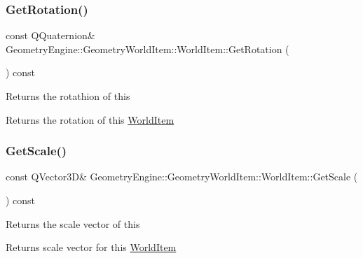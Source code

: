 \subsubsection{\texorpdfstring{GetRotation()}{GetRotation()}}
{\footnotesize\ttfamily const Q\+Quaternion\& Geometry\+Engine\+::\+Geometry\+World\+Item\+::\+World\+Item\+::\+Get\+Rotation (\begin{DoxyParamCaption}{ }\end{DoxyParamCaption}) const\hspace{0.3cm}{\ttfamily [inline]}}

Returns the rotathion of this \begin{DoxyReturn}{Returns}
the rotation of this \mbox{\hyperlink{class_geometry_engine_1_1_geometry_world_item_1_1_world_item}{World\+Item}} 
\end{DoxyReturn}
\mbox{\label{class_geometry_engine_1_1_geometry_world_item_1_1_world_item_a34e1c2617262114189597b1092a2d8ca}} 
\subsubsection{\texorpdfstring{GetScale()}{GetScale()}}
{\footnotesize\ttfamily const Q\+Vector3D\& Geometry\+Engine\+::\+Geometry\+World\+Item\+::\+World\+Item\+::\+Get\+Scale (\begin{DoxyParamCaption}{ }\end{DoxyParamCaption}) const\hspace{0.3cm}{\ttfamily [inline]}}

Returns the scale vector of this \begin{DoxyReturn}{Returns}
scale vector for this \mbox{\hyperlink{class_geometry_engine_1_1_geometry_world_item_1_1_world_item}{World\+Item}} 
\end{DoxyReturn}
\mbox{\label{class_geometry_engine_1_1_geometry_world_item_1_1_world_item_ae7921493ddc77cf794358ae41754a3e0}} 

